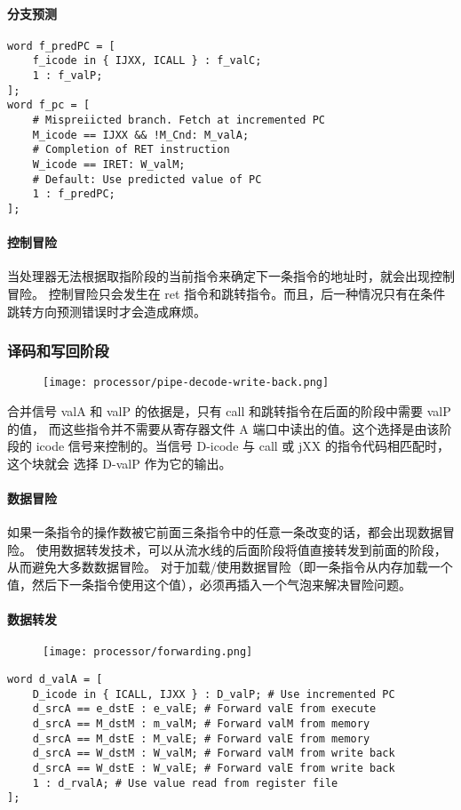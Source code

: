 \paragraph{分支预测}
\begin{lstlisting}[style=CStyle]
word f_predPC = [
    f_icode in { IJXX, ICALL } : f_valC;
    1 : f_valP;
];
word f_pc = [
    # Mispreiicted branch. Fetch at incremented PC
    M_icode == IJXX && !M_Cnd: M_valA;
    # Completion of RET instruction
    W_icode == IRET: W_valM;
    # Default: Use predicted value of PC
    1 : f_predPC;
];
\end{lstlisting}

\paragraph{控制冒险}
当处理器无法根据取指阶段的当前指令来确定下一条指令的地址时，就会出现控制冒险。
控制冒险只会发生在 ret 指令和跳转指令。而且，后一种情况只有在条件跳转方向预测错误时才会造成麻烦。

\subsubsection{译码和写回阶段}
\begin{figure}[H]
    \centering
    \texttt{[image: processor/pipe-decode-write-back.png]}
\end{figure}

合并信号 valA 和 valP 的依据是，只有 call 和跳转指令在后面的阶段中需要 valP 的值，
而这些指令并不需要从寄存器文件 A 端口中读出的值。这个选择是由该阶段的
icode 信号来控制的。当信号 D-icode 与 call 或 jXX 的指令代码相匹配时，这个块就会
选择 D-valP 作为它的输出。

\paragraph{数据冒险}
如果一条指令的操作数被它前面三条指令中的任意一条改变的话，都会出现数据冒险。
使用数据转发技术，可以从流水线的后面阶段将值直接转发到前面的阶段，从而避免大多数数据冒险。
对于加载/使用数据冒险（即一条指令从内存加载一个值，然后下一条指令使用这个值），必须再插入一个气泡来解决冒险问题。


\paragraph{数据转发}
\begin{figure}[H]
    \centering
    \texttt{[image: processor/forwarding.png]}
\end{figure}
\begin{lstlisting}[style=CStyle]
word d_valA = [
    D_icode in { ICALL, IJXX } : D_valP; # Use incremented PC
    d_srcA == e_dstE : e_valE; # Forward valE from execute
    d_srcA == M_dstM : m_valM; # Forward valM from memory
    d_srcA == M_dstE : M_valE; # Forward valE from memory
    d_srcA == W_dstM : W_valM; # Forward valM from write back
    d_srcA == W_dstE : W_valE; # Forward valE from write back
    1 : d_rvalA; # Use value read from register file
];
\end{lstlisting}

